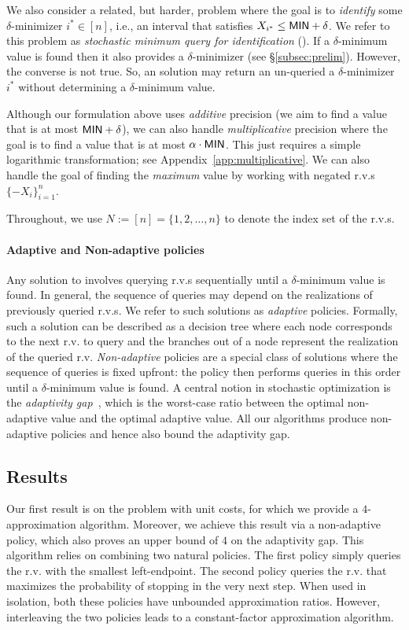 \documentclass[11pt]{article}
\theoremstyle{remark}
\theoremstyle{plain}
\theoremstyle{remark}
\begin{document}
We also consider a related, but harder, problem where the goal is to {\em identify} some    $\delta$-minimizer    $i^*\in [n]$, i.e., an interval that   satisfies $X_{i^*}\le {\sf MIN}+\delta$. We refer to this problem as {\em stochastic minimum query for identification} (\smqi).  If a $\delta$-minimum value is found then it also provides a  $\delta$-minimizer (see \S\ref{subsec:prelim}). However, the converse is not true. So, an \smqi  solution  may return an un-queried a  $\delta$-minimizer   $i^*$ without determining   a  $\delta$-minimum value.
  


Although our formulation above  uses  {\em additive}  precision (we aim to find a value that is at most ${\sf MIN}+\delta$), we can also handle {\em multiplicative} precision where the goal is to find a value that is  at most $\alpha \cdot {\sf MIN}$. This just requires  a simple  logarithmic transformation; see Appendix~\ref{app:multiplicative}. We can also handle the goal of finding the {\em maximum} value by working with negated r.v.s $\{-X_i\}_{i=1}^n$.  

Throughout, we  use $N:=[n]=\{1,2,\dots, n\}$ to denote the index set of the r.v.s.

\paragraph{Adaptive and Non-adaptive policies} Any solution to \smq involves querying  r.v.s sequentially until a   $\delta$-minimum value is found. In general, the sequence  of queries may depend on the realizations of previously queried r.v.s. We refer to such solutions as {\em adaptive} policies. Formally, such a solution can be  described  as a decision tree where each node corresponds to the next r.v. to query and the branches out of a node represent the  realization of the queried r.v. 
{\em Non-adaptive} policies are a special class of solutions where the sequence of queries is fixed upfront: the policy then performs queries in this order until a   $\delta$-minimum value is found. A central notion in stochastic optimization is the {\em adaptivity gap}~\cite{DGV08}, which is the worst-case ratio between the optimal non-adaptive value and the optimal adaptive value.  All our algorithms produce non-adaptive policies and hence also bound the adaptivity gap. 




\subsection{Results}
Our first result is on the \smq problem with unit costs, for which we provide a $4$-approximation algorithm. Moreover, we achieve this result via a non-adaptive policy, which also proves an upper bound of $4$ on the adaptivity gap. This algorithm relies on combining two natural policies. The first policy simply queries the r.v. with the smallest left-endpoint. The second policy queries the r.v. that maximizes the probability of stopping in the very next step. When used in isolation, both  these policies  have unbounded approximation ratios. However, interleaving the two policies leads to a constant-factor approximation algorithm. 
\end{document}
